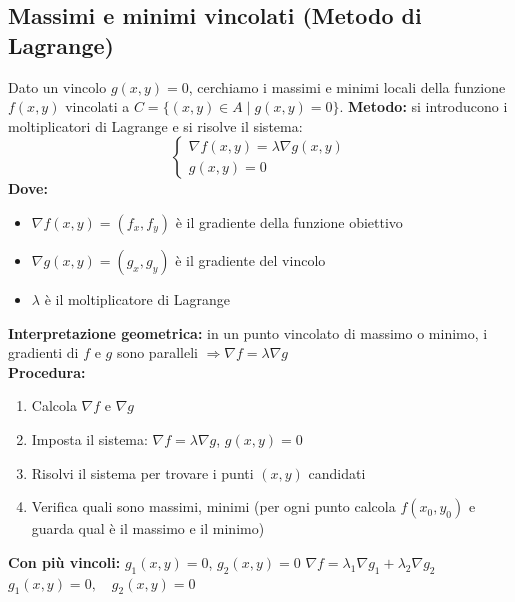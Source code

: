 \documentclass[10pt, a4paper]{article}
\begin{document}
    \subsection{Massimi e minimi vincolati (Metodo di Lagrange)}
        Dato un vincolo $g(x, y) = 0 $, cerchiamo i massimi e minimi locali della funzione $f(x, y)$ vincolati a $C = \{(x, y) \in A \mid g(x, y) = 0\}$.
        \textbf{Metodo:} si introducono i moltiplicatori di Lagrange e si risolve il sistema:
        \begin{equation*}
            \begin{cases}
                \nabla f(x, y) = \lambda \nabla g(x, y) \\
                g(x, y) = 0
            \end{cases}
        \end{equation*}
        \textbf{Dove:}
        \begin{itemize}
            \item $\nabla f(x, y) = (f_x, f_y)$ è il gradiente della funzione obiettivo
            \item $\nabla g(x, y) = (g_x, g_y)$ è il gradiente del vincolo
            \item $\lambda$ è il moltiplicatore di Lagrange
        \end{itemize}
        \textbf{Interpretazione geometrica:} in un punto vincolato di massimo o minimo, i gradienti di $f$ e $g$ sono paralleli $\Rightarrow \nabla f = \lambda \nabla g$
        \\\textbf{Procedura:}
        \begin{enumerate}
            \item Calcola $\nabla f$ e $\nabla g$
            \item Imposta il sistema: $\nabla f = \lambda \nabla g$, $g(x, y) = 0$
            \item Risolvi il sistema per trovare i punti $(x, y)$ candidati
            \item Verifica quali sono massimi, minimi (per ogni punto calcola $f(x_0,y_0)$ e guarda qual è il massimo e il minimo)
        \end{enumerate}
    \textbf{Con più vincoli: } $g_1(x, y) = 0$, $g_2(x, y) = 0$
    $\nabla f = \lambda_1 \nabla g_1 + \lambda_2 \nabla g_2$
    $g_1(x, y) = 0, \quad g_2(x, y) = 0$
\end{document}
